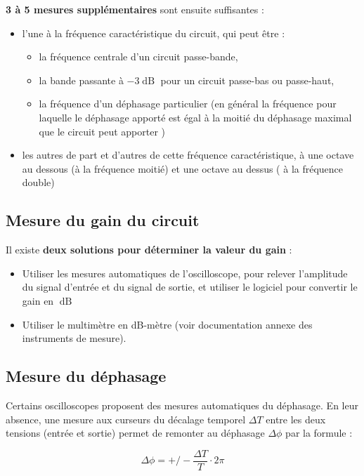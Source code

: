 \textbf{3 à 5 mesures supplémentaires} sont ensuite suffisantes :
\begin{itemize}
	\item l'une à la fréquence caractéristique du circuit, qui peut être : 
	\begin{itemize}
		\item la fréquence centrale d'un circuit passe-bande, 
		\item la bande passante à $-3\operatorname{dB}$ pour un circuit passe-bas ou passe-haut,
		\item la fréquence d'un déphasage particulier (en général la fréquence pour laquelle le déphasage apporté est égal à la moitié du déphasage maximal que le circuit peut apporter )
	\end{itemize}
	\item les autres de part et d'autres de cette fréquence caractéristique, à une octave au dessous (à la fréquence moitié) et une octave au dessus ( à la fréquence double)
\end{itemize}


\subsection*{Mesure du gain du circuit}

Il existe \textbf{deux solutions pour déterminer la valeur du gain} :

\begin{itemize}
	\item Utiliser les mesures automatiques de l'oscilloscope, pour relever l'amplitude du signal d'entrée et du signal de sortie, et utiliser le logiciel pour convertir le gain en $\operatorname{dB}$
	\item Utiliser le multimètre en dB-mètre (voir documentation annexe des instruments de mesure).
\end{itemize}

\subsection*{Mesure du déphasage}

Certains oscilloscopes proposent des mesures automatiques du déphasage. En leur absence, une mesure aux curseurs du décalage temporel $\Delta{}T$ entre les deux tensions (entrée et sortie) permet de remonter au déphasage $\Delta{}\phi$ par la formule :

$$\Delta{}\phi = +/- \frac{\Delta{}T}{T} \cdot 2\pi$$

